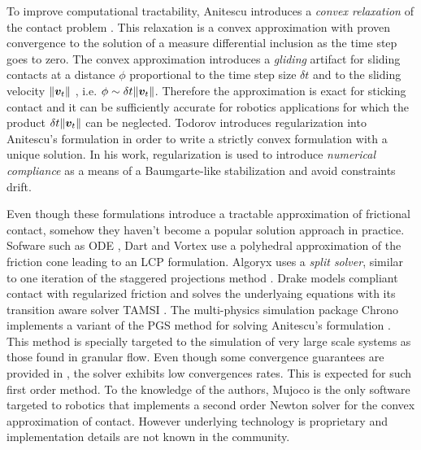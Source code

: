 
To improve computational tractability, Anitescu introduces a \textit{convex
relaxation} of the contact problem \cite{bib:anitescu2006}. This relaxation is a
convex approximation with proven convergence to the solution of a measure
differential inclusion as the time step goes to zero. The convex approximation
introduces a \emph{gliding} artifact for sliding contacts at a distance $\phi$
proportional to the time step size $\delta t$ and to the sliding velocity
$\Vert{\bm{v}}_t\Vert$ \cite{bib:mazhar2014}, i.e. $\phi\sim \delta
t\Vert{\bm{v}}_t\Vert$. Therefore the approximation is exact for sticking contact
and it can be sufficiently accurate for robotics applications for which the
product $\delta t\Vert{\bm{v}}_t\Vert$ can be neglected. Todorov
\cite{bib:todorov2014} introduces regularization into Anitescu's formulation in
order to write a strictly convex formulation with a unique solution. In his
work, regularization is used to introduce \emph{numerical compliance} as a means
of a Baumgarte-like stabilization and avoid constraints drift.

Even though these formulations introduce a tractable approximation of frictional
contact, somehow they haven't become a popular solution approach in practice.
Sofware such as ODE \cite{bib:ode}, Dart \cite{bib:dart} and Vortex
\cite{bib:vortex} use a polyhedral approximation of the friction cone leading to
an LCP formulation. Algoryx \cite{bib:algoryx} uses a \emph{split solver},
similar to one iteration of the staggered projections method
\cite{bib:Kaufman2008}. Drake \cite{bib:drake} models compliant contact with
regularized friction and solves the underlyaing equations with its transition
aware solver TAMSI \cite{bib:castro2020}. The multi-physics simulation package
Chrono \cite{bib:hrono2016} implements a variant of the PGS method for solving
Anitescu's formulation \cite{bib:tasora2011}. This method is specially targeted
to the simulation of very large scale systems as those found in granular flow.
Even though some convergence guarantees are provided in \cite{bib:anitescu2010},
the solver exhibits low convergences rates. This is expected for such first
order method. To the knowledge of the authors, Mujoco \cite{bib:mujoco} is the
only software targeted to robotics that implements a second order Newton solver
for the convex approximation of contact. However  underlying technology is
proprietary and implementation details are not known in the community.

